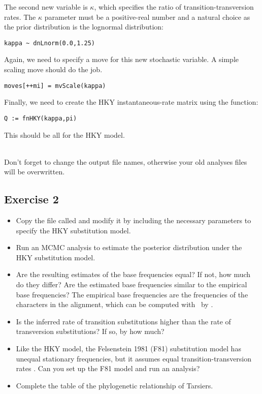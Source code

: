 The second new variable is $\kappa$, which specifies the ratio of transition-transversion rates.
The $\kappa$ parameter must be a positive-real number and a natural choice as the prior distribution is the lognormal distribution:
{\tt \begin{snugshade*}
\begin{lstlisting}
kappa ~ dnLnorm(0.0,1.25)
\end{lstlisting}
\end{snugshade*}}
Again, we need to specify a move for this new stochastic variable.
A simple scaling move should do the job.
{\tt \begin{snugshade*}
\begin{lstlisting}
moves[++mi] = mvScale(kappa)
\end{lstlisting}
\end{snugshade*}}

Finally, we need to create the HKY instantaneous-rate matrix using the  function:
{\tt \begin{snugshade*}
\begin{lstlisting}
Q := fnHKY(kappa,pi)
\end{lstlisting}
\end{snugshade*}}
This should be all for the HKY model.

\noindent \\ \impmark Don't forget to change the output file names, otherwise your old analyses files will be overwritten.

\subsection{Exercise 2}

\begin{itemize}
\item Copy the file called   and modify it by including the necessary parameters to specify the HKY substitution model.
\item Run an MCMC analysis to estimate the posterior distribution under the HKY substitution model.
\item Are the resulting estimates of the base frequencies equal? 
	If not, how much do they differ? 
	Are the estimated base frequencies similar to the empirical base frequencies? 
	The empirical base frequencies are the frequencies of the characters in the alignment, which can be computed with \RevBayes~by .
\item Is the inferred rate of transition substitutions higher than the rate of transversion substitutions? If so, by how much?
\item Like the HKY model, the Felsenstein 1981 (F81) substitution model has unequal stationary frequencies, but it assumes equal transition-transversion rates \citep{Felsenstein1981}.
	Can you set up the F81 model and run an analysis?
\item Complete the table of the phylogenetic relationship of Tarsiers.
\end{itemize}







